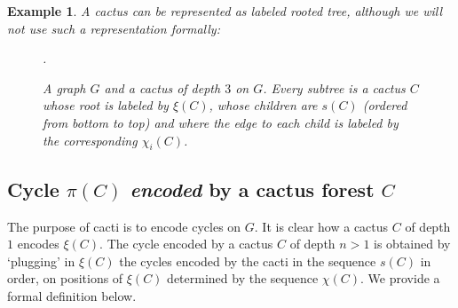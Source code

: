 \documentclass{article}
\newtheorem{example}[theorem]{Example}
\begin{document}
\begin{example} \label{example.cactus}A cactus can be represented as labeled rooted tree, although we will not use such a representation formally:

\begin{figure}[h!]
\begin{center}
\hspace{2cm}
.
\end{center}
\caption{A graph $G$ and a cactus of depth $3$ on $G$. Every subtree is a cactus $C$ whose root is labeled by $\xi(C)$, whose children are $s(C)$ (ordered from bottom to top) and where the edge to each child is labeled by the corresponding $\chi_i(C)$.}
\end{figure}
\end{example}

\subsection{Cycle $\pi(C)$ \textit{encoded} by a cactus forest $C$}

The purpose of cacti is to encode cycles on $G$. It is clear how a cactus $C$ of depth $1$ encodes 
$\xi(C)$. The cycle encoded by a cactus $C$ of depth $n>1$ is obtained by `plugging' in $\xi(C)$ the cycles 
encoded by the cacti in the sequence $s(C)$ in order, on positions of $\xi(C)$ determined by the sequence $\chi(C)$. We provide a formal definition below.
\end{document}
